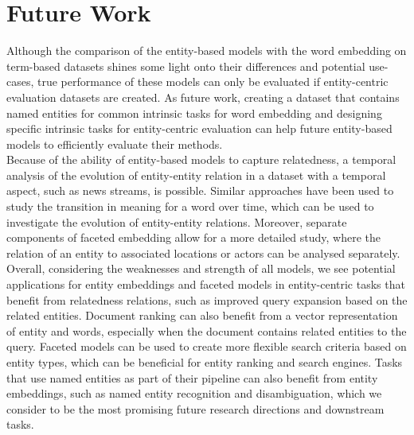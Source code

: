 \section{Future Work}
Although the comparison of the entity-based models with the word embedding on term-based datasets shines some light onto their differences and potential use-cases, true performance of these models can only be evaluated if entity-centric evaluation datasets are created.
As future work, creating a dataset that contains named entities for common intrinsic tasks for word embedding and designing specific intrinsic tasks for entity-centric evaluation can help future entity-based models to efficiently evaluate their methods.\\
Because of the ability of entity-based models to capture relatedness, a temporal analysis of the evolution of entity-entity relation in a dataset with a temporal aspect, such as news streams, is possible. Similar approaches have been used to study the transition in meaning for a word over time, which can be used to investigate the evolution of entity-entity relations. Moreover, separate components of faceted embedding allow for a more detailed study, where the relation of an entity to associated locations or actors can be analysed separately. \\
Overall, considering the weaknesses and strength of all models, we see potential applications for entity embeddings and faceted models in entity-centric tasks that benefit from relatedness relations, such as improved query expansion based on the related entities. Document ranking can also benefit from a vector representation of entity and words, especially when the document contains related entities to the query. Faceted models can be used to create more flexible search criteria based on entity types, which can be beneficial for entity ranking and search engines. Tasks that use named entities as part of their pipeline can also benefit from entity embeddings, such as\deleted{,} named entity recognition and disambiguation, which we consider to be the most promising future research directions and downstream tasks.\\

